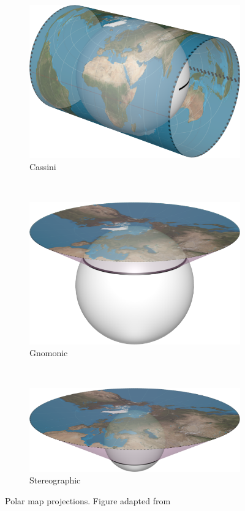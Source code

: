 \begin{figure}[htbp]
    \centering
    \begin{subfigure}[b]{0.3\textwidth}
        \includegraphics[width=\textwidth]{figures/map_projection/projection_cassini.png}
    	\caption{Cassini}
    \end{subfigure}
    ~
    \begin{subfigure}[b]{0.3\textwidth}
        \includegraphics[width=\textwidth]{figures/map_projection/projection_gnomonic.png}
        \caption{Gnomonic}
    \end{subfigure}
    ~
    \begin{subfigure}[b]{0.3\textwidth}
        \includegraphics[width=\textwidth]{figures/map_projection/projection_stereographic.png}
    	\caption{Stereographic}
    \end{subfigure}
    \caption{Polar map projections. Figure adapted from \cite{mapprojections}}
    \label{fig:proj_polar}
\end{figure}

